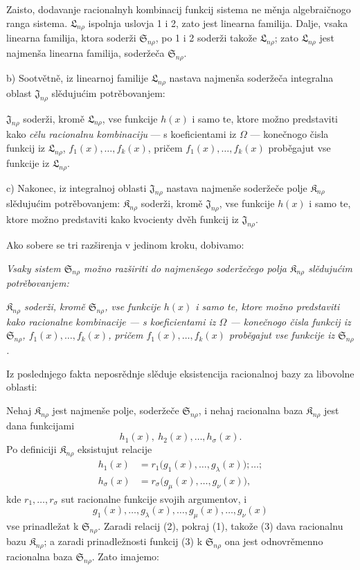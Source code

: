 \documentclass[11pt]{article}
\providecommand{\Kfield}{\mathfrak{K}}
\providecommand{\Ssys}{\mathfrak{S}}
\providecommand{\Jdom}{\mathfrak{J}}
\providecommand{\Lsys}{\mathfrak{L}}
\begin{document}
Zaisto, dodavanje racionalnyh kombinacij funkcij sistema ne měnja algebraičnogo ranga sistema. $\Lsys_{n\rho}$ ispolnja uslovja 1 i 2, zato jest linearna familija. Dalje, vsaka linearna familija, ktora soderži $\Ssys_{n\rho}$, po 1 i 2 soderži takože $\Lsys_{n\rho}$; zato $\Lsys_{n\rho}$ jest najmenša linearna familija, soderžeča $\Ssys_{n\rho}$.

b) Sootvětně, iz linearnoj familije $\Lsys_{n\rho}$ nastava najmenša soderžeča integralna oblast $\Jdom_{n\rho}$ slědujućim potrěbovanjem:

$\Jdom_{n\rho}$ soderži, kromě $\Lsys_{n\rho}$, vse funkcije $h(x)$ i samo te, ktore možno predstaviti kako {\itshape cělu racionalnu kombinaciju} --- s koeficientami iz $\Omega$ --- konečnogo čisla funkcij iz $\Lsys_{n\rho}$, $f_1(x),\ldots,f_k(x)$, pričem $f_1(x),\ldots,f_k(x)$ proběgajut vse funkcije iz $\Lsys_{n\rho}$.

c) Nakonec, iz integralnoj oblasti $\Jdom_{n\rho}$ nastava najmenše soderžeče polje $\Kfield_{n\rho}$ slědujućim potrěbovanjem: $\Kfield_{n\rho}$ soderži, kromě $\Jdom_{n\rho}$, vse funkcije $h(x)$ i samo te, ktore možno predstaviti kako kvocienty dvěh funkcij iz $\Jdom_{n\rho}$.

Ako sobere se tri razširenja v jedinom kroku, dobivamo:

{\itshape Vsaky sistem $\Ssys_{n\rho}$ možno razširiti do najmenšego soderžečego polja $\Kfield_{n\rho}$ slědujućim potrěbovanjem:}

{\itshape $\Kfield_{n\rho}$ soderži, kromě $\Ssys_{n\rho}$, vse funkcije $h(x)$ i samo te, ktore možno predstaviti kako racionalne kombinacije --- s koeficientami iz $\Omega$ --- konečnogo čisla funkcij iz $\Ssys_{n\rho}$, $f_1(x),\ldots,f_k(x)$, pričem $f_1(x),\ldots,f_k(x)$ proběgajut vse funkcije iz $\Ssys_{n\rho}$.}

Iz poslednjego fakta neposrědnje slěduje eksistencija racionalnoj bazy za libovolne oblasti:

Nehaj $\Kfield_{n\rho}$ jest najmenše polje, soderžeče $\Ssys_{n\rho}$, i nehaj racionalna baza $\Kfield_{n\rho}$ jest dana funkcijami
\begin{equation}
  h_1(x),\ h_2(x),\ldots,h_\sigma(x).
\tag{1}
\end{equation}
Po definiciji $\Kfield_{n\rho}$ eksistujut relacije
\begin{equation}
\begin{aligned}
 h_1(x)&=r_1\bigl(g_1(x),\ldots,g_\lambda(x)\bigr);\ldots;\\
 h_\sigma(x)&=r_\sigma\bigl(g_\mu(x),\ldots,g_\nu(x)\bigr),
\end{aligned}
\tag{2}
\end{equation}
kde $r_1,\ldots,r_\sigma$ sut racionalne funkcije svojih argumentov, i
\begin{equation}
  g_1(x),\ldots,g_\lambda(x),\ldots,
  g_\mu(x),\ldots,g_\nu(x)
\tag{3}
\end{equation}
vse prinadležat k $\Ssys_{n\rho}$. Zaradi relacij (2), pokraj (1), takože (3) dava racionalnu bazu $\Kfield_{n\rho}$; a zaradi prinadležnosti funkcij (3) k $\Ssys_{n\rho}$ ona jest odnovrěmenno racionalna baza $\Ssys_{n\rho}$. Zato imajemo:
\end{document}
